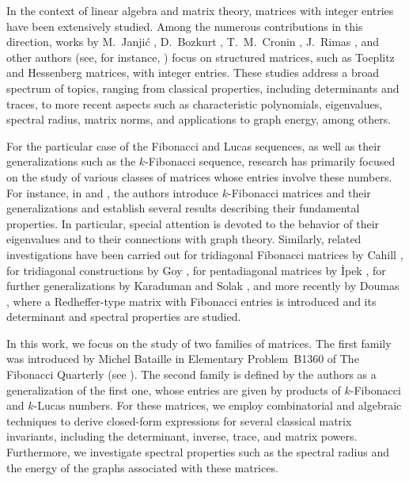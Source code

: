 \documentclass[11pt]{birkjour}
\theoremstyle{definition}
\theoremstyle{remark}
\numberwithin{equation}{section}
\begin{document}
\noindent
In the context of linear algebra and matrix theory, matrices with integer entries have been extensively studied. Among the numerous contributions in this direction, works by M.~Janji\'{c} \cite{Janjic2010}, D.~Bozkurt \cite{Bozkurt2013}, T.~M.~Cronin \cite{Cronin2018}, J.~Rimas \cite{Rimas2007}, and other authors (see, for instance, \cite{BahsiSolak2015,BicknellJohnsonSpears1996}) focus on structured matrices, such as Toeplitz and Hessenberg matrices, with integer entries. These studies address a broad spectrum of topics, ranging from classical properties, including determinants and traces, to more recent aspects such as characteristic polynomials, eigenvalues, spectral radius, matrix norms, and applications to graph energy, among others.

\par\smallskip

\noindent
For the particular case of the Fibonacci and Lucas sequences, as well as their generalizations such as the $k$-Fibonacci sequence, research has primarily focused on the study of various classes of matrices whose entries involve these numbers. For instance, in \cite{LeeLeeShin1997} and \cite{LeeKim2003}, the authors introduce $k$-Fibonacci matrices and their generalizations and establish several results describing their fundamental properties. In particular, special attention is devoted to the behavior of their eigenvalues and to their connections with graph theory. Similarly, related investigations have been carried out for tridiagonal Fibonacci matrices by Cahill \cite{CahillNarayan2004}, for tridiagonal constructions by Goy \cite{GoyShattuck2020}, for pentadiagonal matrices by \.{I}pek \cite{IpekAri2014}, for further generalizations by Karaduman \cite{Karaduman2005,Karaduman2008} and Solak \cite{Solak2005,SolakBozkurt2005}, and more recently by Doumas \cite{Doumas2025}, where a Redheffer-type matrix with Fibonacci entries is introduced and its determinant and spectral properties are studied.
\par\smallskip

\noindent
In this work, we focus on the study of two families of matrices. The first family was introduced by Michel Bataille in Elementary Problem~B1360 of The Fibonacci Quarterly (see \cite{fibonacci2024}). The second family is defined by the authors as a generalization of the first one, whose entries are given by products of $k$-Fibonacci and $k$-Lucas numbers. For these matrices, we employ combinatorial and algebraic techniques to derive closed-form expressions for several classical matrix invariants, including the determinant, inverse, trace, and matrix powers. Furthermore, we investigate spectral properties such as the spectral radius and the energy of the graphs associated with these matrices.
\par\smallskip
\end{document}
